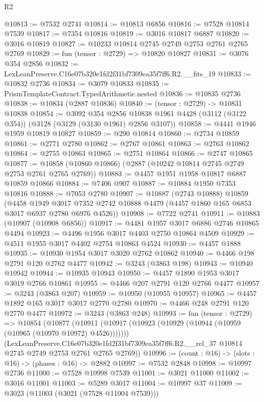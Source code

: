 \begin{lexlean}{R2}
\begin{coremodule}
@10813 := @7532 @2741
@10814 := @10813 @6856
@10816 := @7528 @10814 @7539
@10817 := @7354 @10816
@10819 := @3016 @10817 @6887
@10820 := @3016 @10819
@10827 := @10233 @10814 @2745 @2749 @2753 @2761 @2765 @2769
@10829 := fun (tensor : @2729) => @10820 @10827
@10831 := @3076 @354 @2856
@10832 := LexLeanPreserve.C16e07b320e1fd2f31bf7309ea35f7ff6.R2.__fits_19
@10833 := @10832 @2736
@10834 := @3079 @10833
@10835 := PrismTemplateContract.TypedArithmetic.nested
@10836 := @10835 @2736
@10838 := @10834 (@2887 @10836)
@10840 := (tensor : @2729) -> @10831 @10838
@10854 := @3092
    @354
    @2856
    @10838
    @1961
    @4428
    (@3112 (@3122 @354))
    (@3128 (@3129 (@3130 @1961) @2856 @3107))
@10858 := @4441 @1946 @1959 @10819 @10827
@10859 := @290 @10814
@10860 := @2734 @10859
@10861 := @2771 @2780
@10862 := @2767 @10861
@10863 := @2763 @10862
@10864 := @2755 @10863
@10865 := @2751 @10864
@10866 := @2747 @10865
@10877 := @10858 (@10860 @10866) (@2887 (@10242 @10814 @2745 @2749 @2753 @2761 @2765 @2769))
@10883 := @4457 @1951 @1958 @10817 @6887 @10859 @10866
@10884 := @7406 @907
@10887 := @10884 @1950 @7353 @10816
@10888 := @7053 @2780
@10907 := @10887
    (@2743 @10888)
    @10859
    (@4458
      @1949
      @3017
      @7352
      @2742
      @10888
      @4479
      (@4457 @1860 @165 @6853 @3017 @6937 @2780 @6976 @4526))
@10908 := @7722 @2741
@10911 := @10883 (@10907 (@10908 @6856))
@10917 := @4481 @1957 @3017 @6886 @2746 @10865 @4494
@10923 := @4496 @1956 @3017 @4403 @2750 @10864 @4509
@10929 := @4511 @1955 @3017 @4402 @2754 @10863 @4524
@10930 := @4457 @1888
@10935 := @10930 @1954 @3017 @3020 @2762 @10862
@10940 := @4466 @198 @2791 @120 @2762 @4477
@10942 := @3243 (@3863 @198)
@10943 := @10940 @10942
@10944 := @10935 @10943
@10950 := @4457 @1890 @1953 @3017 @3019 @2766 @10861
@10955 := @4466 @207 @2791 @120 @2766 @4477
@10957 := @3243 (@3863 @207)
@10959 := @10950 (@10955 @10957)
@10965 := @4457 @1892 @165 @3017 @3017 @2770 @2780
@10970 := @4466 @248 @2791 @120 @2770 @4477
@10972 := @3243 (@3863 @248)
@10993 := fun (tensor : @2729) =>
  @10854
    (@10877
      (@10911 (@10917 (@10923 (@10929 (@10944 (@10959 (@10965 (@10970 @10972) @4526)))))))
      (LexLeanPreserve.C16e07b320e1fd2f31bf7309ea35f7ff6.R2.__rel_37
        @10814
        @2745
        @2749
        @2753
        @2761
        @2765
        @2769))
@10996 := (count : @16) -> (slots : @16) -> (phases : @16) -> @2882
@10997 := @7532 @2848
@10998 := @10997 @2736
@11000 := @7528 @10998 @7539
@11001 := @3021 @11000
@11002 := @3016 @11001
@11003 := @5289 @3017
@11004 := @10997 @37
@11009 := @3023 (@11003 (@3021 (@7528 @11004 @7539)))

\end{coremodule}
\end{lexlean}
